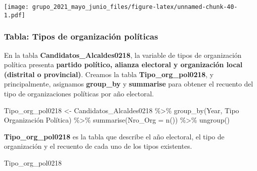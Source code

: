 \documentclass[
]{book}
\newenvironment{Shaded}{\begin{snugshade}}{\end{snugshade}}
\newcommand{\AttributeTok}[1]{\textcolor[rgb]{0.77,0.63,0.00}{#1}}
\newcommand{\FunctionTok}[1]{\textcolor[rgb]{0.00,0.00,0.00}{#1}}
\newcommand{\NormalTok}[1]{#1}
\newcommand{\OtherTok}[1]{\textcolor[rgb]{0.56,0.35,0.01}{#1}}
\newcommand{\SpecialCharTok}[1]{\textcolor[rgb]{0.00,0.00,0.00}{#1}}
\newcommand{\StringTok}[1]{\textcolor[rgb]{0.31,0.60,0.02}{#1}}
\begin{document}
\texttt{[image: grupo\_2021\_mayo\_junio\_files/figure-latex/unnamed-chunk-40-1.pdf]}

\hypertarget{tabla-tipos-de-organizaciuxf3n-poluxedticas}{%
\subsubsection{Tabla: Tipos de organización políticas}\label{tabla-tipos-de-organizaciuxf3n-poluxedticas}}

En la tabla \textbf{Candidatos\_Alcaldes0218}, la variable de tipos de organización política presenta \textbf{partido político, alianza electoral y organización local (distrital o provincial)}. Creamos la tabla \textbf{Tipo\_org\_pol0218}, y principalmente, asignamos \textbf{group\_by} y \textbf{summarise} para obtener el recuento del tipo de organizaciones políticas por año electoral.

\begin{Shaded}
\begin{Highlighting}[]
\NormalTok{Tipo\_org\_pol0218 }\OtherTok{\textless{}{-}}\NormalTok{ Candidatos\_Alcaldes0218 }\SpecialCharTok{\%\textgreater{}\%}
\FunctionTok{group\_by}\NormalTok{(Year, }\StringTok{\textasciigrave{}}\AttributeTok{Tipo Organización Política}\StringTok{\textasciigrave{}}\NormalTok{) }\SpecialCharTok{\%\textgreater{}\%}
\FunctionTok{summarise}\NormalTok{(}\AttributeTok{Nro\_Org =} \FunctionTok{n}\NormalTok{()) }\SpecialCharTok{\%\textgreater{}\%}
  \FunctionTok{ungroup}\NormalTok{()}
\end{Highlighting}
\end{Shaded}

\textbf{Tipo\_org\_pol0218} es la tabla que describe el año electoral, el tipo de organización y el recuento de cada uno de los tipos existentes.

\begin{Shaded}
\begin{Highlighting}[]
\NormalTok{Tipo\_org\_pol0218 }
\end{Highlighting}
\end{Shaded}
\end{document}
